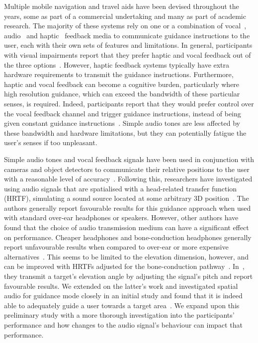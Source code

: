 \documentclass[]{interact}
\begin{document}
Multiple mobile navigation and travel aids have been devised throughout the years, some as part of a commercial undertaking and many as part of academic research.
The majority of these systems rely on one or a combination of vocal~\citep{mocanu2016when,chessa2016integrated,kanwal2015navigation}, audio~\citep{schwarze2015intuitive,rodriguez2012obstacle,katz2010navig} and haptic~\citep{rivera-rubio2015assistive,lee2015rgb,xiao2015assistive} feedback media to communicate guidance instructions to the user, each with their own sets of features and limitations.
In general, participants with visual impairments report that they prefer haptic and vocal feedback out of the three options~\citep{arditi2013user}.
However, haptic feedback systems typically have extra hardware requirements to transmit the guidance instructions.
Furthermore, haptic and vocal feedback can become a cognitive burden, particularly where high resolution guidance, which can exceed the bandwidth of these particular senses, is required.
Indeed, participants report that they would prefer control over the vocal feedback channel and trigger guidance instructions, instead of being given constant guidance instructions~\citep{arditi2013user}.
Simple audio tones are less affected by these bandwidth and hardware limitations, but they can potentially fatigue the user's senses if too unpleasant.

Simple audio tones and vocal feedback signals have been used in conjunction with cameras and object detectors to communicate their relative positions to the user with a reasonable level of accuracy~\citep{schauerte2012assistive,tian2013computer,fiannaca2014headlock,vazquez2012helping}.
Following this, researchers have investigated using audio signals that are spatialised with a head-related transfer function (HRTF), simulating a sound source located at some arbitrary 3D position~\citep{geronazzo2016interactive,wilson2007swan,katz2010navig,blum2013spatialized}.
The authors generally report favourable results for this guidance approach when used with standard over-ear headphones or speakers. 
However, other authors have found that the choice of audio transmission medium can have a significant effect on performance.
Cheaper headphones and bone-conduction headphones generally report unfavourable results when compared to over-ear or more expensive alternatives~\cite{schonstein2008comparison,macdonald2006spatial,stanley2006lateralization}. 
This seems to be limited to the elevation dimension, however, and can be improved with HRTFs adjusted for the bone-conduction pathway~\cite{stanley2006lateralization}.
In~\cite{durette2008visuo}, they transmit a target's elevation angle by adjusting the signal's pitch and report favourable results. 
We extended on the latter's work and investigated spatial audio for guidance mode closely in an initial study and found that it is indeed able to adequately guide a user towards a target area~\cite{lock2019bone}.
We expand upon this preliminary study with a more thorough investigation into the participants' performance and how changes to the audio signal's behaviour can impact that performance.
\end{document}
